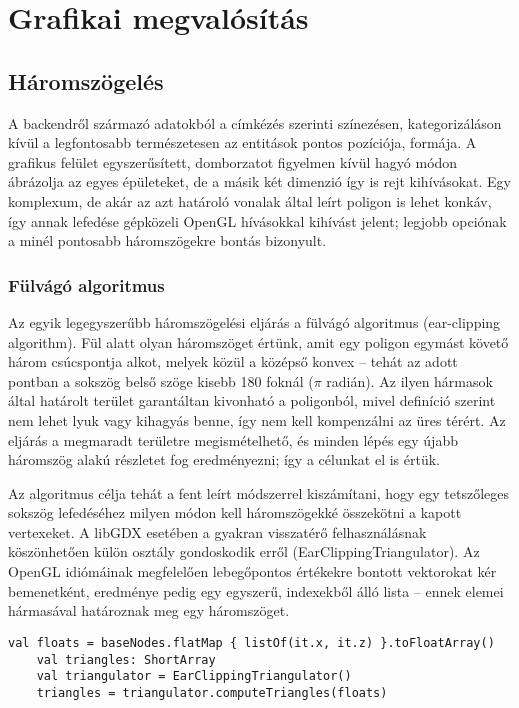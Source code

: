 \chapter{Grafikai megvalósítás}

\section{Háromszögelés}

A backendről származó adatokból a címkézés szerinti színezésen, kategorizáláson kívül a legfontosabb természetesen az entitások pontos pozíciója, formája. A grafikus felület egyszerűsített, domborzatot figyelmen kívül hagyó módon ábrázolja az egyes épületeket, de a másik két dimenzió így is rejt kihívásokat. Egy komplexum, de akár az azt határoló vonalak által leírt poligon is lehet konkáv, így annak lefedése gépközeli OpenGL hívásokkal kihívást jelent; legjobb opciónak a minél pontosabb háromszögekre bontás bizonyult.

\subsection{Fülvágó algoritmus}

Az egyik legegyszerűbb háromszögelési eljárás a fülvágó algoritmus (ear-clipping algorithm). Fül alatt olyan háromszöget értünk, amit egy poligon egymást követő három csúcspontja alkot, melyek közül a középső konvex -- tehát az adott pontban a sokszög belső szöge kisebb 180 foknál ($\pi$ radián).\cite{TriangulationByEarClipping} Az ilyen hármasok által határolt terület garantáltan kivonható a poligonból, mivel definíció szerint nem lehet lyuk vagy kihagyás benne, így nem kell kompenzálni az üres térért. Az eljárás a megmaradt területre megismételhető, és minden lépés egy újabb háromszög alakú részletet fog eredményezni; így a célunkat el is értük.

Az algoritmus célja tehát a fent leírt módszerrel kiszámítani, hogy egy tetszőleges sokszög lefedéséhez milyen módon kell háromszögekké összekötni a kapott vertexeket. A libGDX esetében a gyakran visszatérő felhasználásnak köszönhetően külön osztály gondoskodik erről (EarClippingTriangulator). Az OpenGL idiómáinak megfelelően lebegőpontos értékekre bontott vektorokat kér bemenetként, eredménye pedig egy egyszerű, indexekből álló lista -- ennek elemei hármasával határoznak meg egy háromszöget.

\begin{lstlisting}[caption=Példa az EarClippingTriangulator felhasználására]
    val floats = baseNodes.flatMap { listOf(it.x, it.z) }.toFloatArray()
    val triangles: ShortArray
    val triangulator = EarClippingTriangulator()
    triangles = triangulator.computeTriangles(floats)
\end{lstlisting}

